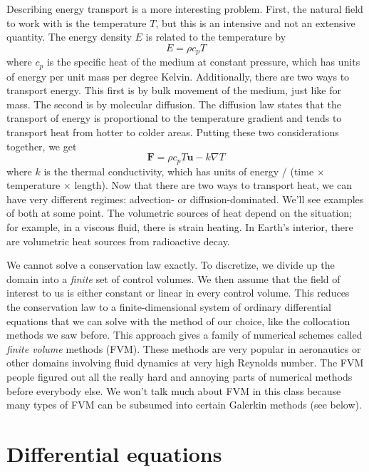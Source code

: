 \documentclass{article}
\theoremstyle{definition}
\theoremstyle{plain}
\newcommand{\bs}{\boldsymbol}
\begin{document}
Describing energy transport is a more interesting problem.
First, the natural field to work with is the temperature $T$, but this is an intensive and not an extensive quantity.
The energy density $E$ is related to the temperature by
\begin{equation}
    E = \rho c_pT
\end{equation}
where $c_p$ is the specific heat of the medium at constant pressure, which has units of energy per unit mass per degree Kelvin.
Additionally, there are two ways to transport energy.
This first is by bulk movement of the medium, just like for mass.
The second is by molecular diffusion.
The diffusion law states that the transport of energy is proportional to the temperature gradient and tends to transport heat from hotter to colder areas.
Putting these two considerations together, we get
\begin{equation}
    \bs F = \rho c_pT\bs u - k\nabla T
\end{equation}
where $k$ is the thermal conductivity, which has units of energy / (time $\times$ temperature $\times$ length).
Now that there are two ways to transport heat, we can have very different regimes: advection- or diffusion-dominated.
We'll see examples of both at some point.
The volumetric sources of heat depend on the situation; for example, in a viscous fluid, there is strain heating.
In Earth's interior, there are volumetric heat sources from radioactive decay.

We cannot solve a conservation law exactly.
To discretize, we divide up the domain into a \emph{finite} set of control volumes.
We then assume that the field of interest to us is either constant or linear in every control volume.
This reduces the conservation law to a finite-dimensional system of ordinary differential equations that we can solve with the method of our choice, like the collocation methods we saw before.
This approach gives a family of numerical schemes called \emph{finite volume} methods (FVM).
These methods are very popular in aeronautics or other domains involving fluid dynamics at very high Reynolds number.
The FVM people figured out all the really hard and annoying parts of numerical methods before everybody else.
We won't talk much about FVM in this class because many types of FVM can be subsumed into certain Galerkin methods (see below).


\section{Differential equations}
\end{document}
